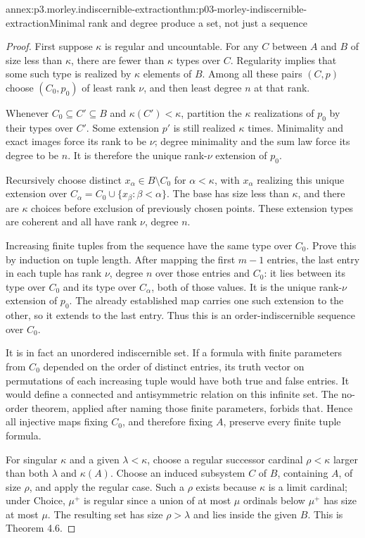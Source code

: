 \begin{annexitem}{annex:p3.morley.indiscernible-extraction}{thm:p03-morley-indiscernible-extraction}{Minimal rank and degree produce a set, not just a sequence}
\begin{proof}
First suppose \(\kappa\) is
regular and uncountable. For
any \(C\) between \(A\)
and \(B\) of size less than
\(\kappa\), there are fewer
than \(\kappa\) types over
\(C\). Regularity implies
that some such type is
realized by \(\kappa\)
elements of \(B\). Among
all these pairs \((C,p)\)
choose \((C_0,p_0)\) of
least rank \(\nu\), and
then least degree \(n\)
at that rank.

Whenever \(C_0\subseteq C'\subseteq B\)
and \(\kappa(C')<\kappa\),
partition the \(\kappa\)
realizations of \(p_0\)
by their types over \(C'\).
Some extension \(p'\)
is still realized \(\kappa\)
times. Minimality and exact
images force its rank to
be \(\nu\); degree
minimality and the sum law
force its degree to be
\(n\). It is therefore
the unique rank-\(\nu\)
extension of \(p_0\).

Recursively choose distinct
\(x_\alpha\in B\setminus C_0\)
for \(\alpha<\kappa\),
with \(x_\alpha\) realizing
this unique extension over
\(C_\alpha=C_0\cup\{x_\beta:\beta<\alpha\}\).
The base has size less
than \(\kappa\), and
there are \(\kappa\)
choices before exclusion
of previously chosen points.
These extension types are
coherent and all have
rank \(\nu\), degree \(n\).

Increasing finite tuples
from the sequence have
the same type over
\(C_0\). Prove this by
induction on tuple length.
After mapping the first
\(m-1\) entries, the
last entry in each tuple
has rank \(\nu\), degree
\(n\) over those entries
and \(C_0\): it lies
between its type over
\(C_0\) and its type
over \(C_\alpha\), both
of those values. It is
the unique rank-\(\nu\)
extension of \(p_0\).
The already established
map carries one such
extension to the other,
so it extends to the
last entry. Thus this
is an order-indiscernible
sequence over \(C_0\).

It is in fact an
unordered indiscernible
set. If a formula with
finite parameters from
\(C_0\) depended on
the order of distinct
entries, its truth vector
on permutations of each
increasing tuple would
have both true and false
entries. It would define
a connected and antisymmetric
relation on this infinite
set. The no-order theorem,
applied after naming those
finite parameters, forbids
that. Hence all injective
maps fixing \(C_0\), and
therefore fixing \(A\),
preserve every finite
tuple formula.

For singular \(\kappa\)
and a given \(\lambda<\kappa\),
choose a regular successor
cardinal \(\rho<\kappa\)
larger than both \(\lambda\)
and \(\kappa(A)\).
Choose an induced subsystem
\(C\) of \(B\), containing
\(A\), of size \(\rho\),
and apply the regular case.
Such a \(\rho\) exists
because \(\kappa\) is a
limit cardinal; under
Choice, \(\mu^+\) is
regular since a union
of at most \(\mu\)
ordinals below \(\mu^+\)
has size at most \(\mu\).
The resulting set has
size \(\rho>\lambda\)
and lies inside the
given \(B\). This is
Theorem 4.6.
\end{proof}
\end{annexitem}

